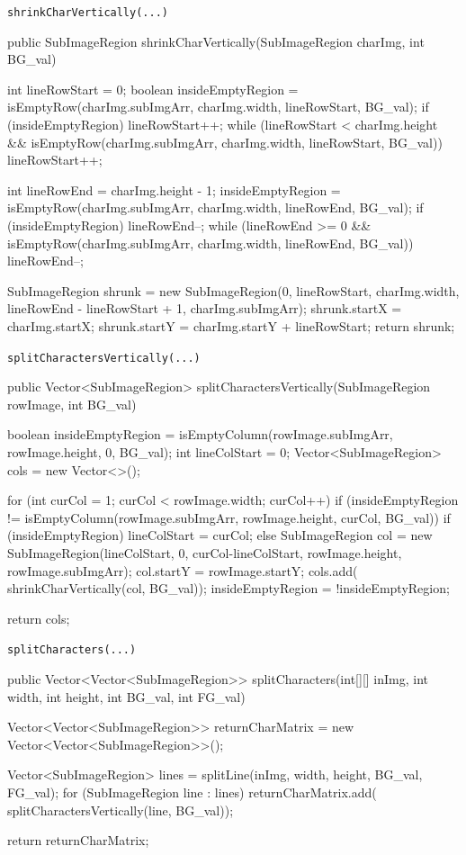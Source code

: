\documentclass[german,notitlepage,smartquotes]{hgbreport}
\begin{document}
\begin{program}
\caption{\texttt{shrinkCharVertically(...)}}
\label{prog:extract-02}
\begin{JavaCode}
public SubImageRegion shrinkCharVertically(SubImageRegion charImg, int BG_val) {
	int lineRowStart = 0;
	boolean insideEmptyRegion = isEmptyRow(charImg.subImgArr, charImg.width, lineRowStart, BG_val);
	if (insideEmptyRegion) {
		lineRowStart++;
		while (lineRowStart < charImg.height && isEmptyRow(charImg.subImgArr, charImg.width, lineRowStart, BG_val)) {
			lineRowStart++;
		}
	}

	int lineRowEnd = charImg.height - 1;
	insideEmptyRegion = isEmptyRow(charImg.subImgArr, charImg.width, lineRowEnd, BG_val);
	if (insideEmptyRegion) {
		lineRowEnd--;
		while (lineRowEnd >= 0 && isEmptyRow(charImg.subImgArr, charImg.width, lineRowEnd, BG_val)) {
			lineRowEnd--;
		}
	}

	SubImageRegion shrunk = new SubImageRegion(0, lineRowStart, charImg.width, lineRowEnd - lineRowStart + 1, charImg.subImgArr);
	shrunk.startX = charImg.startX;
	shrunk.startY = charImg.startY + lineRowStart;
	return shrunk;
}
\end{JavaCode}
\end{program}

\begin{program}
\caption{\texttt{splitCharactersVertically(...)}}
\label{prog:extract-03}
\begin{JavaCode}
public Vector<SubImageRegion> splitCharactersVertically(SubImageRegion rowImage, int BG_val) {
	boolean insideEmptyRegion = isEmptyColumn(rowImage.subImgArr, rowImage.height, 0, BG_val);
	int lineColStart = 0;
	Vector<SubImageRegion> cols = new Vector<>();

	for (int curCol = 1; curCol < rowImage.width; curCol++) {
		if (insideEmptyRegion != isEmptyColumn(rowImage.subImgArr, rowImage.height, curCol, BG_val)) {
			if (insideEmptyRegion) {
				lineColStart = curCol;
			} else{
				SubImageRegion col = new SubImageRegion(lineColStart, 0, curCol-lineColStart, rowImage.height, rowImage.subImgArr);
				col.startY = rowImage.startY;
				cols.add(
						shrinkCharVertically(col, BG_val));
			}
			insideEmptyRegion = !insideEmptyRegion;
		}
	}

	return cols;
}
\end{JavaCode}
\end{program}

\begin{program}
\caption{\texttt{splitCharacters(...)}}
\label{prog:extract-04}
\begin{JavaCode}
public Vector<Vector<SubImageRegion>> splitCharacters(int[][] inImg, int width, int height, int BG_val, int FG_val) {
	Vector<Vector<SubImageRegion>> returnCharMatrix = new Vector<Vector<SubImageRegion>>();

	Vector<SubImageRegion> lines = splitLine(inImg, width, height, BG_val, FG_val);
	for (SubImageRegion line : lines) {
		returnCharMatrix.add(
				splitCharactersVertically(line, BG_val));
	}

	return returnCharMatrix;
}
\end{JavaCode}
\end{program}
\end{document}
